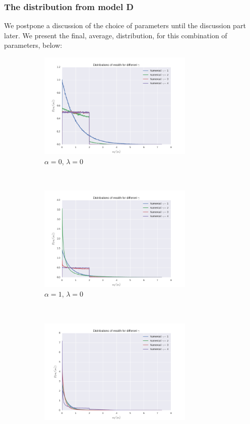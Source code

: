 \documentclass[a4paper, 10pt]{article}
\begin{document}
\subsubsection{The distribution from model D}
We postpone a discussion of the choice of parameters until the discussion part later. We present the final, average, distribution, for this combination of parameters, below:
\begin{figure}[!ht] %
	\centering
    \begin{subfigure}[H!]{0.5\textwidth}
    	\centering
    	\includegraphics[height=2.0in]{distGammasA0.png}
    	\caption{$\alpha = 0$, $\lambda=0$}\label{fig:ModelD_dist_1}
    \end{subfigure}%
    ~
    \begin{subfigure}[H!]{0.5\textwidth}
        \centering
        \includegraphics[height=2.0in]{distGammasA1.png} %
        \caption{$\alpha = 1$, $\lambda=0$}\label{fig:ModelD_dist_2}
    \end{subfigure}
    ~ 
     \begin{subfigure}[H!]{0.5\textwidth}
        \centering
        \includegraphics[height=2.0in]{distGammasA2.png}

\end{subfigure}
\end{figure}
\end{document}
